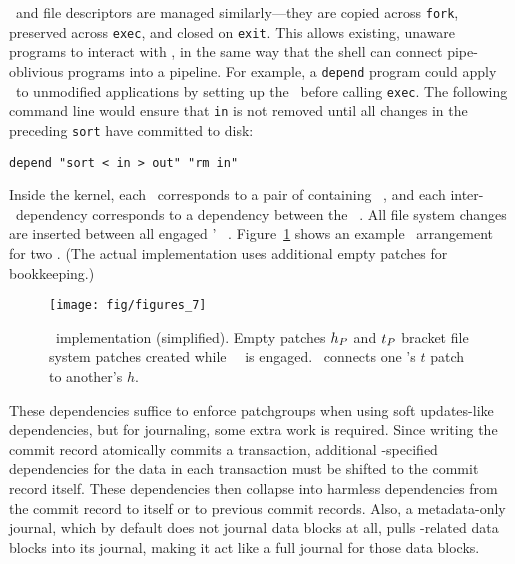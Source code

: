 \Patchgroups\ and file descriptors are managed similarly---they are copied
across \texttt{fork}, preserved across \texttt{exec}, and closed on
\texttt{exit}.
%
This allows existing, unaware programs to interact with \patchgroups,
in the same way that the shell can connect pipe-oblivious programs
into a pipeline.
%
For example, a \texttt{depend} program could apply \patchgroups\ to
unmodified applications by setting up the \patchgroups\ before calling
\texttt{exec}.  The following command line would ensure that \texttt{in} is
not removed until all changes in the preceding \texttt{sort} have committed
to disk:

\vspace{-0.5\baselineskip}
\begin{center}
\begin{small}
\verb+depend "sort < in > out" "rm in"+
\end{small}
\end{center}
\vspace{-0.5\baselineskip}


Inside the kernel, each \patchgroup\ corresponds to a pair of containing
\noop\ \patches,
and each inter-\patchgroup\ dependency corresponds to a dependency between
the \noop\ \patches.
%
All file system changes are inserted
between all engaged \patchgroups' \noop\ \patches.
%
Figure~\ref{fig:patchgroup-patches} shows an example \patch\ arrangement for
two \patchgroups.
%
(The actual implementation uses additional empty patches for bookkeeping.)

\begin{figure}[t]
\centering
\texttt{[image: fig/figures\_7]}
\caption{\Patchgroup\ implementation (simplified).  Empty
patches $h_{P}$ and $t_{P}$ bracket file system patches created while
\patchgroup\ \pgPg\ is engaged.  \pgDepend\ connects one
\patchgroup's $t$ patch to another's $h$.}
\label{fig:patchgroup-patches} 
\end{figure}

These dependencies suffice to enforce patchgroups when using soft
updates-like dependencies, but for journaling, some extra work is required.
%
Since writing the commit record atomically commits a
transaction, additional \patchgroup-specified dependencies for the data in each
transaction must be shifted to the commit record itself.
%
These dependencies then collapse into harmless dependencies from the commit
record to itself or to previous commit records.
%
Also, a metadata-only journal, which by default does not journal data
blocks at all, pulls \patchgroup-related data blocks into its journal,
making it act like a full journal for those data blocks.

